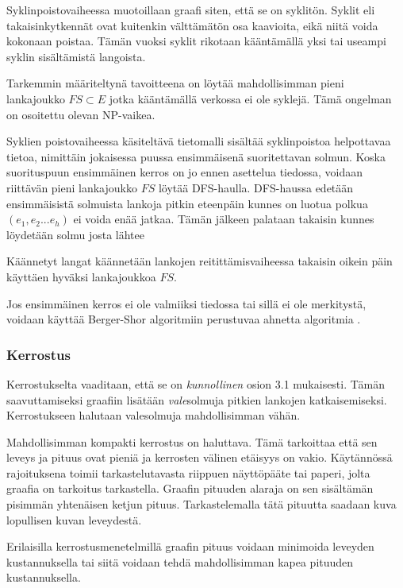 \documentclass[finnish,12pt]{article}
\begin{document}
Syklinpoistovaiheessa muotoillaan graafi siten, että se on syklitön.
Syklit eli takaisinkytkennät ovat kuitenkin välttämätön osa kaavioita, eikä niitä voida kokonaan poistaa.
Tämän vuoksi syklit rikotaan kääntämällä yksi tai useampi syklin sisältämistä langoista.

Tarkemmin määriteltynä tavoitteena on löytää mahdollisimman pieni lankajoukko $FS \subset E $ jotka kääntämällä verkossa ei ole syklejä.
Tämä ongelman on osoitettu olevan NP-vaikea. \cite{RefWorks:65}

Syklien poistovaiheessa käsiteltävä tietomalli sisältää syklinpoistoa helpottavaa tietoa, nimittäin jokaisessa puussa ensimmäisenä suoritettavan solmun.
Koska suorituspuun ensimmäinen kerros on jo ennen asettelua tiedossa, voidaan riittävän pieni lankajoukko $FS$ löytää DFS-haulla. 
DFS-haussa edetään ensimmäisistä solmuista lankoja pitkin eteenpäin kunnes on luotua polkua $(e_1,e_2...e_h)$ ei voida enää jatkaa.
Tämän jälkeen palataan takaisin kunnes löydetään solmu josta lähtee 
\cite{RefWorks:69}

Käännetyt langat käännetään lankojen reitittämisvaiheessa takaisin oikein päin käyttäen hyväksi lankajoukkoa $FS$.

Jos ensimmäinen kerros ei ole valmiiksi tiedossa tai sillä ei ole merkitystä, voidaan käyttää Berger-Shor algoritmiin \cite{RefWorks:68} perustuvaa ahnetta algoritmia \cite{RefWorks:48}.

		\subsubsection{Kerrostus}

Kerrostukselta vaaditaan, että se on \emph{kunnollinen} osion 3.1 mukaisesti.
Tämän saavuttamiseksi graafiin lisätään \emph{vale}solmuja pitkien lankojen katkaisemiseksi.
Kerrostukseen halutaan valesolmuja mahdollisimman vähän.

Mahdollisimman kompakti kerrostus on haluttava.
Tämä tarkoittaa että sen leveys ja pituus ovat pieniä ja kerrosten välinen etäisyys on vakio. 
Käytännössä rajoituksena toimii tarkastelutavasta riippuen näyttöpääte tai paperi, jolta graafia on tarkoitus tarkastella.
Graafin pituuden alaraja on sen sisältämän pisimmän yhtenäisen ketjun pituus.
Tarkastelemalla tätä pituutta saadaan kuva lopullisen kuvan leveydestä.

Erilaisilla kerrostusmenetelmillä graafin pituus voidaan minimoida leveyden kustannuksella tai siitä voidaan tehdä mahdollisimman kapea pituuden kustannuksella.
\end{document}
